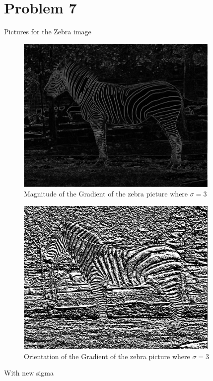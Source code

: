 \documentclass[11pt,psfig]{article}
\begin{document}
\section*{Problem 7}

Pictures for the Zebra image

\begin{figure}[H]
\centering
\includegraphics[height=3in]{magGradient_zebra1.jpg}
\caption{Magnitude of the Gradient of the zebra picture where $\sigma=3$}
\end{figure}

\begin{figure}[H]
\centering
\includegraphics[height=3in]{orientGradient_zebra1.jpg}
\caption{Orientation of the Gradient of the zebra picture where $\sigma=3$}
\end{figure}

With new sigma
\end{document}
